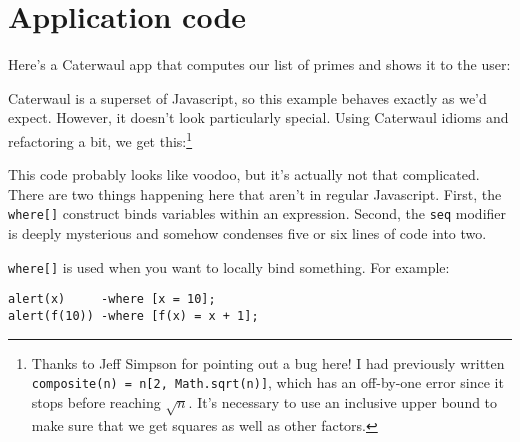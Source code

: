 \documentclass{report}
\begin{document}
\section{Application code}
    Here's a Caterwaul app that computes our list of primes and shows it to the user:


    Caterwaul is a superset of Javascript, so this example behaves exactly as we'd expect. However, it doesn't look particularly special. Using Caterwaul idioms and refactoring a bit, we get
    this:\footnote{Thanks to Jeff Simpson for pointing out a bug here! I had previously written {\tt composite(n) = n[2, Math.sqrt(n)]}, which has an off-by-one error since it stops before
    reaching $\sqrt n$. It's necessary to use an inclusive upper bound to make sure that we get squares as well as other factors.}


    This code probably looks like voodoo, but it's actually not that complicated. There are two things happening here that aren't in regular Javascript. First, the {\tt where[]} construct
    binds variables within an expression. Second, the {\tt seq} modifier is deeply mysterious and somehow condenses five or six lines of code into two.

    {\tt where[]} is used when you want to locally bind something. For example:

\begin{verbatim}
alert(x)     -where [x = 10];
alert(f(10)) -where [f(x) = x + 1];
\end{verbatim}
\end{document}
